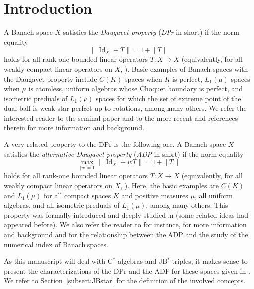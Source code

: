 \documentclass[10pt]{amsart}
\DeclareMathOperator{\id}{Id}
\begin{document}
	\section{Introduction}
	A Banach space $X$ satisfies the \emph{Daugavet property} (\emph{DPr} in short) if
	the norm equality
	\begin{equation}\label{eq DP} \tag{DE}
		\|\id_{X} + T\| = 1+\|T\|
	\end{equation}
	holds for all rank-one bounded linear operators $T\colon X \longrightarrow X$ (equivalently, for all weakly compact linear operators on $X$, \cite{kssw}). Basic examples of Banach spaces with the Daugavet property include $C(K)$ spaces when $K$ is perfect, $L_1(\mu)$ spaces when $\mu$ is atomless, uniform algebras whose Choquet boundary is perfect, and isometric preduals of $L_1(\mu)$ spaces for which the set of extreme point of the dual ball is weak-star perfect up to rotations, among many others. We refer the interested reader to the seminal paper \cite{kssw} and to the more recent \cite{HallerLangemetsLimaNadelRueda, LopezRueda2021,MarRueda2022,RuedaTradaceteVillanueva} and references therein for more information and background.
	
	A very related property to the DPr is the following one. A Banach space $X$ satisfies the \emph{alternative Daugavet property} (\emph{ADP} in short) if the norm equality
	\begin{equation}\label{eq ADP} \tag{aDE}
		\max_{|w|=1} \|\id_{X} + w T\| = 1+\|T\|
	\end{equation}
	holds for all rank-one bounded linear operators $T\colon X \longrightarrow X$ (equivalently, for all weakly compact linear operators on $X$, \cite[Theorem~2.2]{MarOikh2004}). Here, the basic examples are $C(K)$ and $L_1(\mu)$ for all compact spaces $K$ and positive measures $\mu$, all uniform algebras, and all isometric preduals of $L_1(\mu)$, among many others. This property was formally introduced and deeply studied in \cite{MarOikh2004} (some related ideas had appeared before). We also refer the reader to \cite{AviKadMarMerSheTAMS2010,SpearsBook,Mar2008} for instance, for more information and background and for the relationship between the ADP and the study of the numerical index of Banach spaces.
	
	As this manuscript will deal with C$^*$-algebras and JB$^*$-triples, it makes sense to present the characterizations of the DPr and the ADP for these spaces given in \cite{BeMar2005,Mar2008,MarOikh2004,Oik2002}. We refer to Section~\ref{subsect:JBstar} for the definition of the involved concepts.
	
\end{document}
